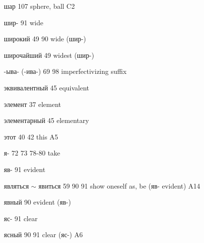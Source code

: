\begin{minipage}[t]{0.475\textwidth}
\raggedright
\noindent шар 107 sphere, ball C2\par
\noindent шир- 91 wide\par
\noindent широкий 49 90 wide (шир-)\par
\noindent широчайший 49 widest (шир-)\par
\noindent -ыва- (-ива-) 69 98 imperfectivizing suffix\par
\noindent эквивалентный 45 equivalent\par
\noindent элемент 37 element\par
\noindent элементарный 45 elementary\par
\noindent этот 40 42 this A5\par
\noindent я- 72 73 78-80 take\par
\noindent яв- 91 evident\par
\noindent являться $\sim$ явиться 59 90 91 show oneself as, be (яв- evident) A14\par
\noindent явный 90 evident (яв-)\par
\noindent яс- 91 clear\par
\noindent ясный 90 91 clear (яс-) A6\par
\end{minipage}
\endgroup
